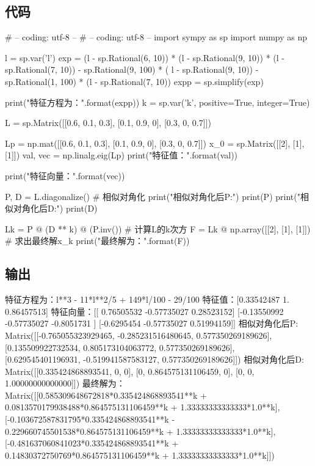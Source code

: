 \subsection{代码}
\begin{python}
    # -- coding: utf-8 --
# -- coding: utf-8 --
import sympy as sp
import numpy as np

l = sp.var('l')
exp = (l - sp.Rational(6, 10)) * (l - sp.Rational(9, 10)) * (l - sp.Rational(7, 10)) - sp.Rational(9, 100) * (
        l - sp.Rational(9, 10)) - sp.Rational(1, 100) * (l - sp.Rational(7, 10))
expp = sp.simplify(exp)

print("特征方程为：{}".format(expp))
k = sp.var('k', positive=True, integer=True)

L = sp.Matrix([[0.6, 0.1, 0.3],
           [0.1, 0.9, 0],
           [0.3, 0, 0.7]])

Lp = np.mat([[0.6, 0.1, 0.3],
           [0.1, 0.9, 0],
           [0.3, 0, 0.7]])
x_0 = sp.Matrix([[2], [1], [1]])
val, vec = np.linalg.eig(Lp)
print("特征值：{}".format(val))

print("特征向量：{}".format(vec))

P, D = L.diagonalize()  # 相似对角化
print("相似对角化后P:")
print(P)
print("相似对角化后D:")
print(D)

Lk = P @ (D ** k) @ (P.inv())  # 计算L的k次方
F = Lk @ np.array([[2], [1], [1]])  # 求出最终解x_k
print("最终解为：\n{}".format(F))
\end{python}
\subsection{输出}
\begin{python}
    特征方程为：l**3 - 11*l**2/5 + 149*l/100 - 29/100
特征值：[0.33542487 1.         0.86457513]
特征向量：[[ 0.76505532 -0.57735027  0.28523152]
 [-0.13550992 -0.57735027 -0.8051731 ]
 [-0.6295454  -0.57735027  0.51994159]]
相似对角化后P:
Matrix([[-0.765055323929465, -0.285231516480645, 0.577350269189626], [0.135509922732534, 0.805173104063772, 0.577350269189626], [0.629545401196931, -0.519941587583127, 0.577350269189626]])
相似对角化后D:
Matrix([[0.335424868893541, 0, 0], [0, 0.864575131106459, 0], [0, 0, 1.00000000000000]])
最终解为：
Matrix([[0.585309648672818*0.335424868893541**k + 0.0813570179938488*0.864575131106459**k + 1.33333333333333*1.0**k], [-0.103672587831795*0.335424868893541**k - 0.229660745501538*0.864575131106459**k + 1.33333333333333*1.0**k], [-0.481637060841023*0.335424868893541**k + 0.14830372750769*0.864575131106459**k + 1.33333333333333*1.0**k]])

\end{python}


